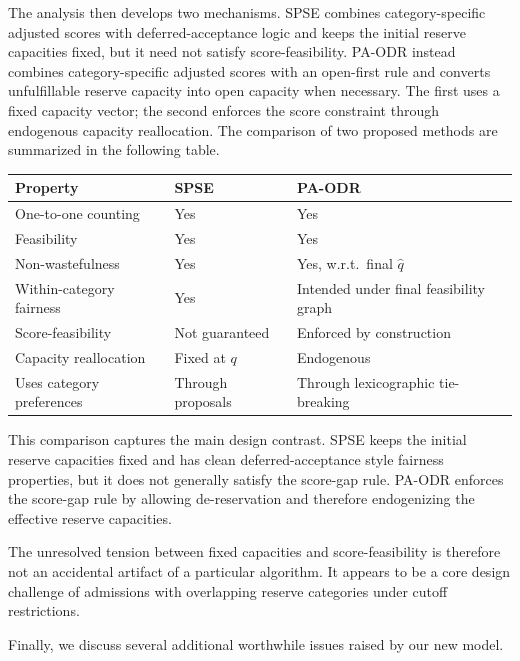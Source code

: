 \documentclass[12pt]{article}
\newcommand{\1}{\mathbf{1}}
\begin{document}
The analysis then develops two mechanisms. SPSE combines category-specific adjusted scores with deferred-acceptance logic and keeps the initial reserve capacities fixed, but it need not satisfy score-feasibility. PA-ODR instead combines category-specific adjusted scores with an open-first rule and converts unfulfillable reserve capacity into open capacity when necessary. The first uses a fixed capacity vector; the second enforces the score constraint through endogenous capacity reallocation. The comparison of two proposed methods are summarized in the following table.

\begin{center}
\renewcommand{\arraystretch}{1.3}
\begin{tabular}{lll}
\toprule
\textbf{Property} & \textbf{SPSE} & \textbf{PA-ODR} \\
\midrule
One-to-one counting & Yes & Yes \\
Feasibility & Yes & Yes \\
Non-wastefulness & Yes & Yes, w.r.t.\ final $\hat q$ \\
Within-category fairness & Yes & Intended under final feasibility graph \\
Score-feasibility & Not guaranteed & Enforced by construction \\
Capacity reallocation & Fixed at $q$ & Endogenous \\
Uses category preferences & Through proposals & Through lexicographic tie-breaking \\
\bottomrule
\end{tabular}
\end{center}

This comparison captures the main design contrast. SPSE keeps the initial reserve capacities fixed and has clean deferred-acceptance style fairness properties, but it does not generally satisfy the score-gap rule. PA-ODR enforces the score-gap rule by allowing de-reservation and therefore endogenizing the effective reserve capacities.

The unresolved tension between fixed capacities and score-feasibility is therefore not an accidental artifact of a particular algorithm. It appears to be a core design challenge of admissions with overlapping reserve categories under cutoff restrictions.

Finally, we discuss several additional worthwhile issues raised by our new model.
\end{document}
